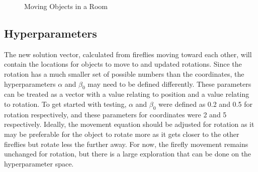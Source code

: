 \documentclass[sigconf,authordraft]{acmart}
\begin{document}
    \begin{figure}[!h]
        \centering
        \hfill
        \caption{Moving Objects in a Room}
        \label{resolving_conflicts}
    \end{figure}

    \subsection{Hyperparameters}
    \label{hyperparameters_section}
    The new solution vector, calculated from fireflies moving toward each other, will contain the locations for objects to move to and updated rotations. Since the rotation has a much smaller set of possible numbers than the coordinates, the hyperparameters $\alpha$ and $\beta_0$ may need to be defined differently. These parameters can be treated as a vector with a value relating to position and a value relating to rotation. To get started with testing, $\alpha$ and $\beta_0$ were defined as 0.2 and 0.5 for rotation respectively, and these parameters for coordinates were 2 and 5 respectively. Ideally, the movement equation should be adjusted for rotation as it may be preferable for the object to rotate more as it gets closer to the other fireflies but rotate less the further away. For now, the firefly movement remains unchanged for rotation, but there is a large exploration that can be done on the hyperparameter space.
\end{document}
